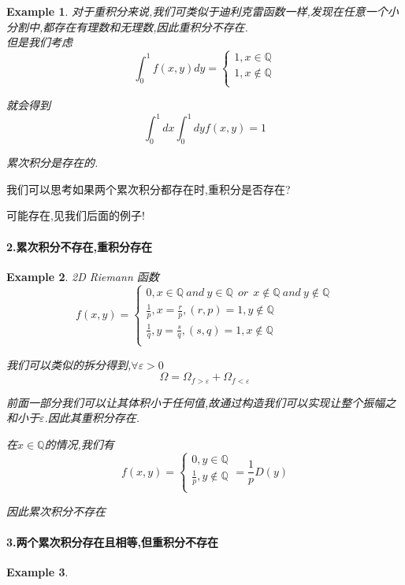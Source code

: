 \documentclass[11pt,hyperref,a4paper,UTF8]{ctexart}
\newtheorem{example}{Example}[subsection]
\newcommand{\QQ}{\mathbb{Q}}
\begin{document}
\begin{CJK}{UTF8}{gkai}
\begin{example}
  对于重积分来说,我们可类似于迪利克雷函数一样,发现在任意一个小分割中,都存在有理数和无理数,因此重积分不存在.\\

  但是我们考虑
  \[\int_{0}^{1}f(x,y) dy = \begin{cases}
    1 ,x \in \QQ\\
    1, x \notin \QQ\\
  \end{cases}\]

  就会得到
  \[\int_{0}^{1}dx \int_{0}^{1}dy f(x,y) = 1\]

  累次积分是存在的.
\end{example}

我们可以思考如果两个累次积分都存在时,重积分是否存在?

可能存在,见我们后面的例子!

\paragraph{2.累次积分不存在,重积分存在}
\begin{example}
  2D Riemann 函数
  \[f(x,y)= \begin{cases}
    0, x \in \QQ ~and~ y \in \QQ ~~or~~ x \notin \QQ ~and~ y \notin \QQ\\
    \frac{1}{p}, x  = \frac{r}{p}, (r,p) = 1, y \notin \QQ\\
    \frac{1}{q}, y = \frac{s}{q}, (s,q) = 1, x \notin \QQ\\
  \end{cases}\]

  我们可以类似的拆分得到,$\forall \varepsilon > 0$
  \[\Omega = \Omega_{f > \varepsilon} + \Omega_{f < \varepsilon}\]

  前面一部分我们可以让其体积小于任何值,故通过构造我们可以实现让整个振幅之和小于$\varepsilon$.因此其重积分存在.

  在$x \in \QQ$的情况,我们有
  \[f(x,y) = \begin{cases}
    0, y \in \QQ\\
    \frac{1}{p}, y \notin \QQ\\
  \end{cases} = \frac{1}{p} D(y)\]

  因此累次积分不存在
\end{example}

\paragraph{3.两个累次积分存在且相等,但重积分不存在}
\begin{example}


\end{example}
\end{CJK}
\end{document}
